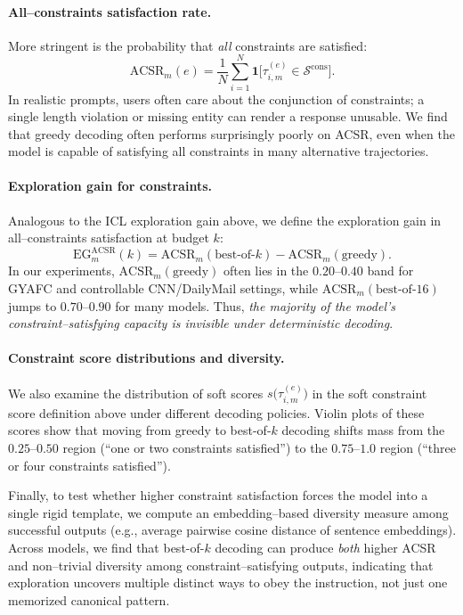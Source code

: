 \paragraph{All--constraints satisfaction rate.}
More stringent is the probability that \emph{all} constraints are satisfied:
\[
\mathrm{ACSR}_{m}(e)
= \frac{1}{N} \sum_{i=1}^{N}
  \mathbf{1}\big[ \tau^{(e)}_{i,m} \in \mathcal{S}^{\text{cons}} \big].
\]
In realistic prompts, users often care about the conjunction of constraints; a
single length violation or missing entity can render a response unusable. We
find that greedy decoding often performs surprisingly poorly on ACSR, even when
the model is capable of satisfying all constraints in many alternative
trajectories.

\paragraph{Exploration gain for constraints.}
Analogous to the ICL exploration gain above, we define the exploration gain in
all--constraints satisfaction at budget $k$:
\[
\mathrm{EG}^{\text{ACSR}}_{m}(k)
= \mathrm{ACSR}_{m}(\text{best-of-}k)
- \mathrm{ACSR}_{m}(\text{greedy}).
\]
In our experiments, $\mathrm{ACSR}_{m}(\text{greedy})$ often lies in the
$0.20\text{--}0.40$ band for GYAFC and controllable CNN/DailyMail settings,
while $\mathrm{ACSR}_{m}(\text{best-of-}16)$ jumps to $0.70\text{--}0.90$ for
many models. Thus, \emph{the majority of the model's constraint--satisfying
capacity is invisible under deterministic decoding}.

\paragraph{Constraint score distributions and diversity.}
We also examine the distribution of soft scores
$s\big(\tau^{(e)}_{i,m}\big)$ in the soft constraint score definition above
under different decoding policies. Violin plots of these scores show that
moving from greedy to best-of-$k$ decoding shifts mass from the $0.25\text{--}0.50$ region
(``one or two constraints satisfied'') to the $0.75\text{--}1.0$ region
(``three or four constraints satisfied'').

Finally, to test whether higher constraint satisfaction forces the model into a
single rigid template, we compute an embedding--based diversity measure among
successful outputs (e.g., average pairwise cosine distance of sentence
embeddings). Across models, we find that best-of-$k$ decoding can produce
\emph{both} higher ACSR and non--trivial diversity among
constraint--satisfying outputs, indicating that exploration uncovers multiple
distinct ways to obey the instruction, not just one memorized canonical
pattern.



